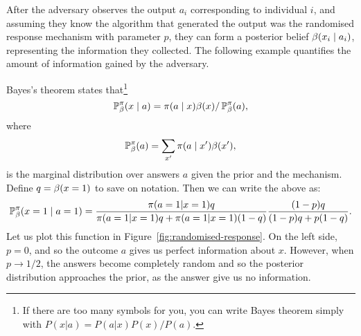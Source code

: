 \begin{frame}
{    After the adversary observes the output $a_i$ corresponding to
    individual $i$, and assuming they know the algorithm that
    generated the output was the randomised response mechanism with
    parameter $p$, they can form a posterior belief
    $\beta(x_i \mid a_i)$, representing the information they
    collected. The following example quantifies the amount of
    information gained by the adversary.  }
  \begin{example}
    Bayes's theorem states that\footnote{If there are too many symbols for you, you can write Bayes theorem simply with $P(x | a) = P(a | x) P(x) / P(a)$.}
    \[
      \mathop{\mbox{\ensuremath{\mathbb{P}}}}\nolimits^\pi_\beta(x \mid a) = \pi(a \mid x) \beta(x) / \mathop{\mbox{\ensuremath{\mathbb{P}}}}\nolimits^\pi_\beta(a),
    \]
    where
    \[
      \mathop{\mbox{\ensuremath{\mathbb{P}}}}\nolimits^\pi_\beta(a) = \sum_{x'} \pi(a \mid x') \beta(x'),
    \]
    is the marginal distribution over answers $a$ given the prior and the mechanism.
    Define $q = \beta(x = 1)$ to save on notation. Then we can write the above as:
    \[
      \mathop{\mbox{\ensuremath{\mathbb{P}}}}\nolimits^\pi_\beta(x = 1 \mid a = 1) =
      \frac{\pi(a = 1 | x = 1) q}
      {\pi(a = 1 | x = 1) q + \pi(a = 1 | x = 1) (1 - q)}
      \frac{(1 - p) q}{(1 - p)q + p(1 - q)}.
    \]
    Let us plot this function in Figure~\ref{fig:randomised-response}. On the left side, $p = 0$, and so the outcome $a$ gives us perfect information about $x$. However, when $p \to 1/2$, the answers become completely random and so the posterior distribution approaches the prior, as the answer give us no information.
    \begin{figure}[h]
      \centering
\end{figure}
\end{example}
\end{frame}
